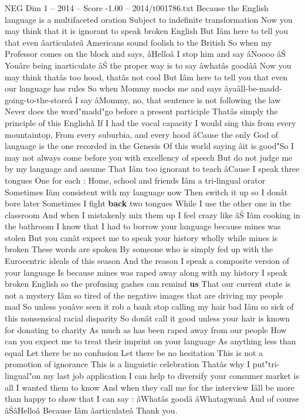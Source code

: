 \begin{textsample}{NEG Dim 1 – 2014 – Score -1.00 – 2014/t001786.txt}
Because the English language is a multifaceted oration Subject to indefinite transformation Now you may think that it is ignorant to speak broken English But Iâm here to tell you that even âarticulateâ Americans sound foolish to the British So when my Professor comes on the block and says, âHelloâ I stop him and say âNoooo âŚ Youâre being inarticulate âŚ the proper way is to say âwhatâs goodââ Now you may think thatâs too hood, thatâs not cool But Iâm here to tell you that even our language has rules So when Mommy mocks me and says âyaâll-be-madd-going-to-the-storeâ I say âMommy, no, that sentence is not following the law Never does the word"madd"go before a present participle Thatâs simply the principle of this Englishâ If I had the vocal capacity I would sing this from every mountaintop, From every suburbia, and every hood âCause the only God of language is the one recorded in the Genesis Of this world saying âit is good"So I may not always come before you with excellency of speech But do not judge me by my language and assume That Iâm too ignorant to teach âCause I speak three tongues One for each : Home, school and friends Iâm a tri-lingual orator Sometimes Iâm consistent with my language now Then switch it up so I donât bore later Sometimes I fight \textbf{back} two tongues While I use the other one in the classroom And when I mistakenly mix them up I feel crazy like âŚ Iâm cooking in the bathroom I know that I had to borrow your language because mines was stolen But you canât expect me to speak your history wholly while mines is broken These words are spoken By someone who is simply fed up with the Eurocentric ideals of this season And the reason I speak a composite version of your language Is because mines was raped away along with my history I speak broken English so the profusing gashes can remind \textbf{us} That our current state is not a mystery Iâm so tired of the negative images that are driving my people mad So unless youâve seen it rob a bank stop calling my hair bad Iâm so sick of this nonsensical racial disparity So donât call it good unless your hair is known for donating to charity As much as has been raped away from our people How can you expect me to treat their imprint on your language As anything less than equal Let there be no confusion Let there be no hesitation This is not a promotion of ignorance This is a linguistic celebration Thatâs why I put"tri-lingual"on my last job application I can help to diversify your consumer market is all I wanted them to know And when they call me for the interview Iâll be more than happy to show that I can say : âWhatâs goodâ âWhatagwanâ And of course âŚâHelloâ Because Iâm âarticulateâ Thank you.

\end{textsample}
